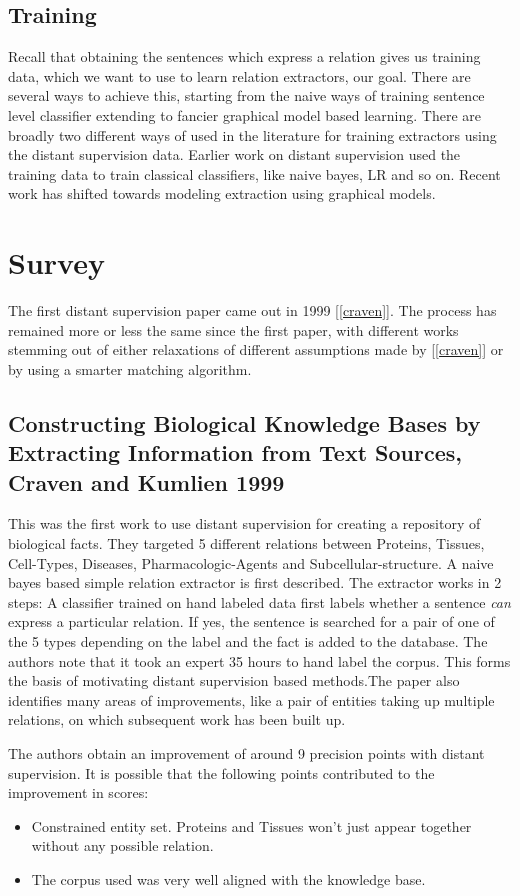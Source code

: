 \documentclass[a4paper,10pt]{article}
\begin{document}
\subsection{Training}
Recall that obtaining the sentences which express a relation gives us training data, which 
we want to use to learn relation extractors, our goal.
There are several ways to achieve this, starting from the naive ways of training sentence 
level classifier extending to fancier graphical model based learning.
There are broadly two different ways of used in the literature for training extractors using the distant supervision data.
Earlier work on distant supervision used the training data to train classical classifiers, like naive bayes, LR and so on.
Recent work has shifted towards modeling extraction using graphical models.
\section{Survey}

The first distant supervision paper came out in 1999 [\ref{craven}]. The process has remained more or less the same since the first paper, with 
different works stemming out of either relaxations of different assumptions made by [\ref{craven}] or by using a smarter matching algorithm.

\subsection{Constructing Biological Knowledge Bases by Extracting Information from Text Sources, Craven and Kumlien 1999}
This was the first work to use distant supervision for creating a repository of biological facts. 
They targeted 5 different relations between Proteins, Tissues, Cell-Types, Diseases, Pharmacologic-Agents and Subcellular-structure.
A naive bayes based simple relation extractor is first described. The extractor works in 2 steps:  A classifier trained on hand labeled data
first labels whether a sentence \emph{can} express a particular relation. If yes, the sentence is searched for a pair of one of the 5 types
depending on the label and the fact is added to the database.
The authors note that it took an expert 35 hours to hand label the corpus. This forms the basis of motivating distant supervision based 
methods.The paper also identifies many areas of improvements, like a pair of entities taking up multiple relations, on which subsequent work has been
built up.

The authors obtain an improvement of around 9 precision points with distant supervision.
It is possible that the following points contributed to the improvement in scores:
\begin{itemize}
 \item Constrained entity set. Proteins and Tissues won't just appear together without any possible relation. 
 \item The corpus used was very well aligned with the knowledge base.
\end{itemize}
\end{document}
